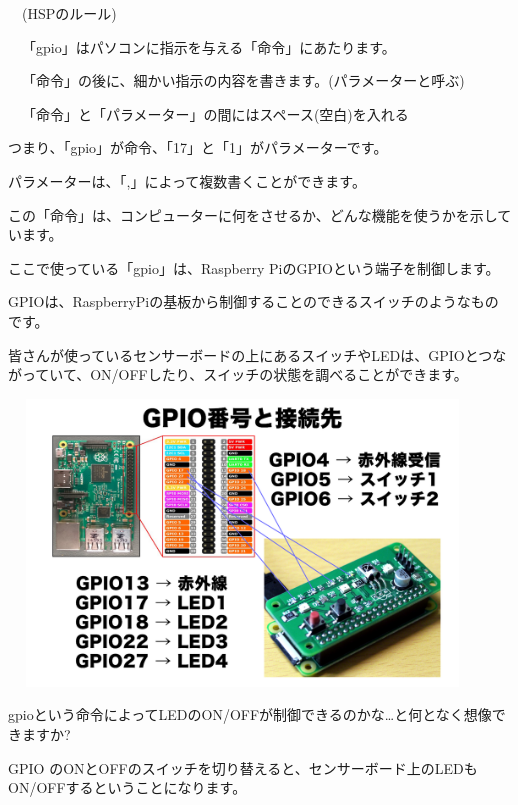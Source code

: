 \documentclass[a4paper,12pt]{jarticle}
\begin{document}
\ \ (HSPのルール)


\bigskip

\ \ 「gpio」はパソコンに指示を与える「命令」にあたります。

\ \ 「命令」の後に、細かい指示の内容を書きます。(パラメーターと呼ぶ)

\ \ 「命令」と「パラメーター」の間にはスペース(空白)を入れる


\bigskip

つまり、「gpio」が命令、「17」と「1」がパラメーターです。

パラメーターは、「,」によって複数書くことができます。

この「命令」は、コンピューターに何をさせるか、どんな機能を使うかを示しています。

ここで使っている「gpio」は、Raspberry PiのGPIOという端子を制御します。


\bigskip

GPIOは、RaspberryPiの基板から制御することのできるスイッチのようなものです。

皆さんが使っているセンサーボードの上にあるスイッチやLEDは、GPIOとつながっていて、ON/OFFしたり、スイッチの状態を調べることができます。


\bigskip
\bigskip

\begin{minipage}{9.781cm}
\centering
{\upshape
\includegraphics[keepaspectratio,width=12.409cm,height=7.62cm]{text02-img/text02-img025.png}}
\end{minipage}

\bigskip
\bigskip
\bigskip

gpioという命令によってLEDのON/OFFが制御できるのかな…と何となく想像できますか?

GPIO
のONとOFFのスイッチを切り替えると、センサーボード上のLEDもON/OFFするということになります。
\end{document}
